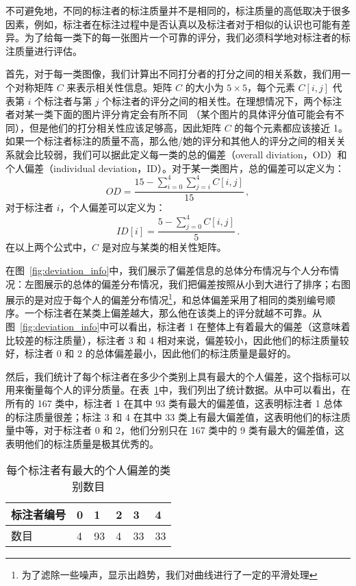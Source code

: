 不可避免地，不同的标注者的标注质量并不是相同的，标注质量的高低取决于很多因素，例如，标注者在标注过程中是否认真以及标注者对于相似的认识也可能有差异。为了给每一类下的每一张图片一个可靠的评分，我们必须科学地对标注者的标注质量进行评估。

首先，对于每一类图像，我们计算出不同打分者的打分之间的相关系数，我们用一个对称矩阵 $C$ 来表示相关性信息。矩阵 $C$ 的大小为 $5\times 5$，每个元素 $C[i,j]$ 代表第 $i$ 个标注者与第 $j$ 个标注者的评分之间的相关性。在理想情况下，两个标注者对某一类下面的图片评分肯定会有所不同 （某个图片的具体评分值可能会有不同），但是他们的打分相关性应该足够高，因此矩阵 $C$ 的每个元素都应该接近 1。如果一个标注者标注的质量不高，那么他/她的评分和其他人的评分之间的相关关系就会比较弱，我们可以据此定义每一类的总的偏差（overall diviation，OD）和个人偏差（individual deviation，ID）。对于某一类图片，总的偏差可以定义为：
\begin{equation}
OD = \frac{15 - \sum_{i=0}^{4}\sum_{j=i}^{4}C[i,j]}{15}\, ,
\end{equation}
对于标注者 $i$，个人偏差可以定义为：
\begin{equation}
	ID[i] = \frac{5 - \sum_{j=0}^{4}C[i, j]}{5}\, .
\end{equation}
在以上两个公式中，$C$ 是对应与某类的相关性矩阵。

在图~\ref{fig:deviation_info}中，我们展示了偏差信息的总体分布情况与个人分布情况：左图展示的总体的偏差分布情况，我们把偏差按照从小到大进行了排序；右图展示的是对应于每个人的偏差分布情况\footnote{为了滤除一些噪声，显示出趋势，我们对曲线进行了一定的平滑处理}，和总体偏差采用了相同的类别编号顺序。一个标注者在某类上偏差越大，那么他在该类上的评分就越不可靠。从图~\ref{fig:deviation_info}中可以看出，标注者 1 在整体上有着最大的偏差（这意味着比较差的标注质量），标注者 3 和 4 相对来说，偏差较小，因此他们的标注质量较好，标注者 0 和 2 的总体偏差最小，因此他们的标注质量是最好的。

然后，我们统计了每个标注者在多少个类别上具有最大的个人偏差，这个指标可以用来衡量每个人的评分质量。在表~\ref{table:largest_devi_num}中，我们列出了统计数据。从中可以看出，在所有的 167 类中，标注者 1 在其中 93 类有最大的偏差值，这表明标注者 1 总体的标注质量很差；标注 3 和 4 在其中 33 类上有最大偏差值，这表明他们的标注质量中等，对于标注者 0 和 2，他们分别只在 167 类中的 9 类有最大的偏差值，这表明他们的标注质量是极其优秀的。
\begin{table}[!t]
	\centering
	\caption{每个标注者有最大的个人偏差的类别数目}
	\begin{tabular}{@{}llllll@{}}
		\toprule
		标注者编号	    &  0		& 1 & 2 & 3 & 4  \\
		\midrule
		数目 &  4 & 93 & 4 & 33 & 33 \\
		\bottomrule
	\end{tabular}
	\label{table:largest_devi_num}
\end{table}

